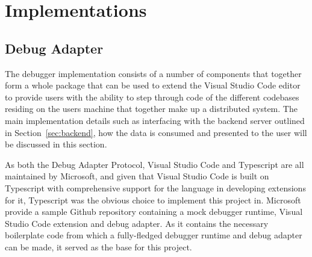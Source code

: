\documentclass[12pt,pdftex,titlepage]{report}
\begin{document}
        \newpage          
        \section{Implementations}    
            \subsection{Debug Adapter}
            \label{sec:impldebug}
                The debugger implementation consists of a number of components that together form a whole package that can be used to extend the Visual Studio Code editor to provide users with the ability
                to step through code of the different codebases residing on the users machine that together make up a distributed system. The main implementation details such as interfacing with the backend
                server outlined in Section~\ref{sec:backend}, how the data is consumed and presented to the user will be discussed in this section.

                As both the Debug Adapter Protocol, Visual Studio Code and Typescript are all maintained by Microsoft, and given that Visual Studio Code is built on Typescript with comprehensive support for the language
                in developing extensions for it, Typescript was the obvious choice to implement this project in. Microsoft provide a sample Github repository containing a mock debugger runtime, Visual Studio Code extension
                and debug adapter. As it contains the necessary boilerplate code from which a fully-fledged debugger runtime and debug adapter can be made, it served as the base for this project.
\end{document}
